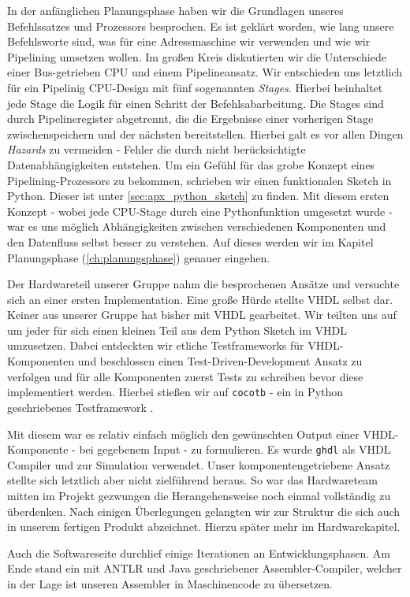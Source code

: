 \documentclass[paper=a4,fontsize=12pt,twocolumn]{scrreprt}
\begin{document}
In der anfänglichen Planungsphase haben wir die Grundlagen unseres Befehlssatzes und Prozessors besprochen.
Es ist geklärt worden, wie lang unsere Befehlsworte sind, was für eine Adressmaschine wir verwenden und wie wir Pipelining umsetzen wollen.
Im großen Kreis diskutierten wir die Unterschiede einer Bus-getrieben CPU und einem Pipelineansatz.
Wir entschieden uns letztlich für ein Pipelinig CPU-Design mit fünf sogenannten \textit{Stages}.
Hierbei beinhaltet jede Stage die Logik für einen Schritt der Befehlsabarbeitung.
Die Stages sind durch Pipelineregister abgetrennt, die die Ergebnisse einer vorherigen Stage zwischenspeichern und der nächsten bereitstellen.
Hierbei galt es vor allen Dingen \textit{Hazards} zu vermeiden - Fehler die durch nicht berücksichtigte Datenabhängigkeiten entstehen.
Um ein Gefühl für das grobe Konzept eines Pipelining-Prozessors zu bekommen, schrieben wir einen funktionalen Sketch in Python.
Dieser ist unter \ref{sec:apx_python_sketch} zu finden.
Mit diesem ersten Konzept - wobei jede CPU-Stage durch eine Pythonfunktion umgesetzt wurde - war es uns möglich Abhängigkeiten zwischen verschiedenen Komponenten und den Datenfluss selbst besser zu verstehen.
Auf dieses werden wir im Kapitel Planungsphase (\ref{ch:planungsphase}) genauer eingehen.

Der Hardwareteil unserer Gruppe nahm die besprochenen Ansätze und versuchte sich an einer ersten Implementation.
Eine große Hürde stellte VHDL selbst dar.
Keiner aus unserer Gruppe hat bisher mit VHDL gearbeitet.
Wir teilten uns auf um jeder für sich einen kleinen Teil aus dem Python Sketch im VHDL umzusetzen.
Dabei entdeckten wir etliche Testframeworks für VHDL-Komponenten und beschlossen einen Test-Driven-Development Ansatz zu verfolgen und für alle Komponenten zuerst Tests zu schreiben bevor diese implementiert werden.
Hierbei stießen wir auf \texttt{cocotb} - ein in Python geschriebenes Testframework \autocite{cocotb}.

Mit diesem war es relativ einfach möglich den gewünschten Output einer VHDL-Komponente - bei gegebenem Input - zu formulieren.
Es wurde \texttt{ghdl} als VHDL Compiler und zur Simulation verwendet.
Unser komponentengetriebene Ansatz stellte sich letztlich aber nicht zielführend heraus.
So war das Hardwareteam mitten im Projekt gezwungen die Herangehensweise noch einmal vollständig zu überdenken.
Nach einigen Überlegungen gelangten wir zur Struktur die sich auch in unserem fertigen Produkt abzeichnet.
Hierzu später mehr im Hardwarekapitel.

Auch die Softwareseite durchlief einige Iterationen an Entwicklungsphasen.
Am Ende stand ein mit ANTLR und Java geschriebener Assembler-Compiler, welcher in der Lage ist unseren Assembler in Maschinencode zu übersetzen.
\end{document}
